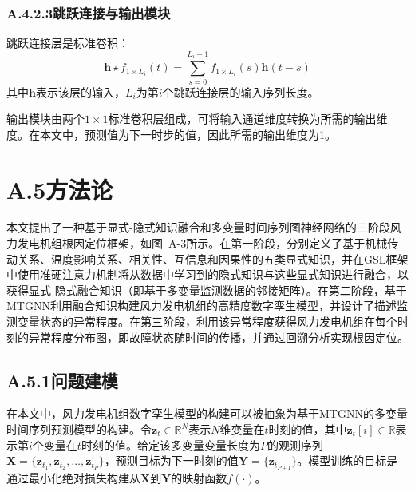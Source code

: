 \subsubsection*{A.4.2.3\quad 跳跃连接与输出模块}

跳跃连接层是标准卷积：
\begin{equation}
\boldsymbol{h} \star f_{1\times L_i}(t) = \sum_{s=0}^{L_i - 1} f_{1\times L_i}(s) \boldsymbol{h}(t - s)
\end{equation}
其中$\boldsymbol{h}$表示该层的输入，$L_i$为第$i$个跳跃连接层的输入序列长度。

输出模块由两个$1 \times 1$标准卷积层组成，可将输入通道维度转换为所需的输出维度。在本文中，预测值为下一时步的值，因此所需的输出维度为1。

\section*{A.5\quad 方法论}

本文提出了一种基于显式-隐式知识融合和多变量时间序列图神经网络的三阶段风力发电机组根因定位框架，如图~A-3所示。在第一阶段，分别定义了基于机械传动关系、温度影响关系、相关性、互信息和因果性的五类显式知识，并在GSL框架中使用准硬注意力机制将从数据中学习到的隐式知识与这些显式知识进行融合，以获得显式-隐式融合知识（即基于多变量监测数据的邻接矩阵）。在第二阶段，基于MTGNN利用融合知识构建风力发电机组的高精度数字孪生模型，并设计了描述监测变量状态的异常程度。在第三阶段，利用该异常程度获得风力发电机组在每个时刻的异常程度分布图，即故障状态随时间的传播，并通过回溯分析实现根因定位。


\subsection*{A.5.1\quad 问题建模}

在本文中，风力发电机组数字孪生模型的构建可以被抽象为基于MTGNN的多变量时间序列预测模型的构建。令$\boldsymbol{z}_t \in \mathbb{R}^N$表示$N$维变量在$t$时刻的值，其中$\boldsymbol{z}_t[i] \in \mathbb{R}$表示第$i$个变量在$t$时刻的值。给定该多变量变量长度为$P$的观测序列$\boldsymbol{X} = \{\boldsymbol{z}_{t_1}, \boldsymbol{z}_{t_2}, \ldots, \boldsymbol{z}_{t_P}\}$，预测目标为下一时刻的值$\boldsymbol{Y} = \{\boldsymbol{z}_{t_{P+1}}\}$。模型训练的目标是通过最小化绝对损失构建从$\boldsymbol{X}$到$\boldsymbol{Y}$的映射函数$f(\cdot)$。

